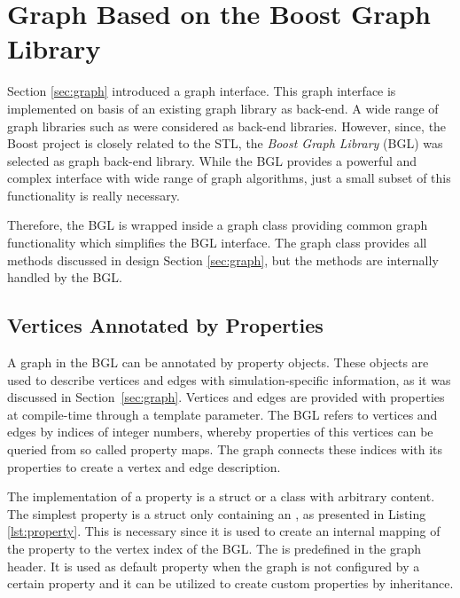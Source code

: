 \section{Graph Based on the Boost Graph Library}
\label{sec:impl:graph}
Section \ref{sec:graph} introduced a graph interface.  This graph
interface is implemented on basis of an existing graph library as
back-end. A wide range of graph libraries such as \cite{ref:lemon,
  ref:boost_bgl, ref:igraph, ref:ogdf} were considered as back-end
libraries.  However, since, the Boost project is closely related to
the STL, the \emph{Boost Graph Library} \cite{ref:boost_bgl} (BGL) was
selected as graph back-end library.  While the BGL provides a powerful
and complex interface with wide range of graph algorithms, just a small subset of
this functionality is really necessary.

Therefore, the BGL is wrapped inside a graph class providing common
graph functionality which simplifies the BGL interface.  The graph
class provides all methods discussed in design Section
\ref{sec:graph}, but the methods are internally handled by the BGL.


\subsection{Vertices Annotated by Properties}

A graph in the BGL can be annotated by property objects. These objects are
used to describe vertices and edges with simulation-specific
information, as it was discussed in Section~\ref{sec:graph}. Vertices
and edges are provided with properties at compile-time through a
template parameter.  The BGL refers to vertices and edges by indices
of integer numbers, whereby properties of this vertices can be queried
from so called property maps.  The graph connects these indices with
its properties to create a vertex and edge description.

The implementation of a property is a struct or a class with arbitrary
content. The simplest property is a struct only containing an
, as presented in Listing \ref{lst:property}. This  is
necessary since it is used to create an internal mapping of the
property to the vertex index of the BGL.  The  is
predefined in the graph header. It is used as default property when
the graph is not configured by a certain property and it can be utilized
to create custom properties by inheritance.

